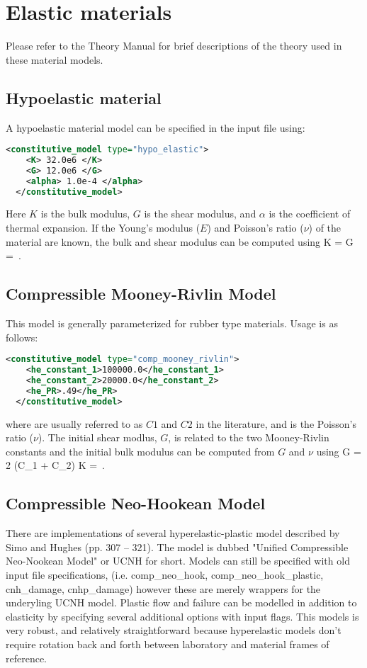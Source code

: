 \section{Elastic materials}
Please refer to the \Vaango Theory Manual for brief descriptions of the theory used in 
these material models.

\subsection{Hypoelastic material}
A hypoelastic material model can be specified in the  input file using:
\begin{lstlisting}[language=XML]
  <constitutive_model type="hypo_elastic">
    <K> 32.0e6 </K>
    <G> 12.0e6 </G>
    <alpha> 1.0e-4 </alpha>
  </constitutive_model>
\end{lstlisting}

Here $K$ is the bulk modulus, $G$ is the shear modulus, and $\alpha$ is the coefficient
of thermal expansion.  If the Young's modulus ($E$) and Poisson's ratio ($\nu$) of the 
material are known, the bulk and shear modulus can be computed using
\Beq
  K =  \quad \Tand \quad
  G =  \,.
\Eeq

\subsection{Compressible Mooney-Rivlin Model} This model is generally parameterized
for rubber type materials.  Usage is as follows:
\begin{lstlisting}[language=XML]
  <constitutive_model type="comp_mooney_rivlin">
    <he_constant_1>100000.0</he_constant_1>
    <he_constant_2>20000.0</he_constant_2>
    <he_PR>.49</he_PR>
  </constitutive_model>
\end{lstlisting}
where  are usually referred to
as $C1$ and $C2$ in the literature, and  is the Poisson's ratio ($\nu$).
The initial shear modlus, $G$, is related to the two Mooney-Rivlin constants and the 
initial bulk modulus can be computed from $G$ and $\nu$ using
\Beq
  G = 2 (C_1 + C_2) \quad \Tand \quad K =  \,.
\Eeq

\subsection{Compressible Neo-Hookean Model} There are implementations of several
hyperelastic-plastic model described by Simo and Hughes\cite{Simo1998} (pp. 307 -- 321). 
 The model is dubbed "Unified Compressible Neo-Nookean Model" or UCNH for short.  Models can 
still be specified with old input file specifications, (i.e. comp\_neo\_hook, comp\_neo\_hook\_plastic,
cnh\_damage, cnhp\_damage) however these are merely wrappers for the underyling UCNH model.
 Plastic flow and failure can be modelled in addition to elasticity by  specifying 
several additional options with input flags. This models is very robust, and relatively 
straightforward because hyperelastic models don't require rotation back and forth 
between laboratory and material frames of reference.


